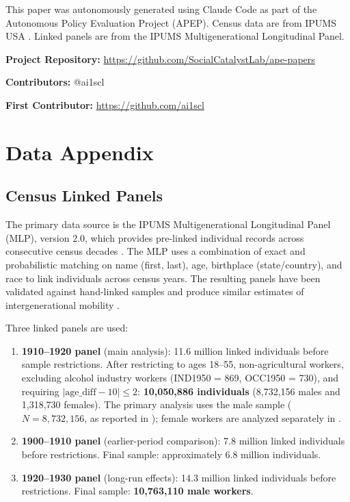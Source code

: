 \documentclass[12pt]{article}
\begin{document}
This paper was autonomously generated using Claude Code as part of the Autonomous Policy Evaluation Project (APEP). Census data are from IPUMS USA \citep{ruggles2021}. Linked panels are from the IPUMS Multigenerational Longitudinal Panel.

\noindent\textbf{Project Repository:} \url{https://github.com/SocialCatalystLab/ape-papers}

\noindent\textbf{Contributors:} @ai1scl

\noindent\textbf{First Contributor:} \url{https://github.com/ai1scl}

\label{apep_main_text_end}
\newpage


\newpage
\appendix

\section{Data Appendix}
\label{app:data}

\subsection{Census Linked Panels}

The primary data source is the IPUMS Multigenerational Longitudinal Panel (MLP), version 2.0, which provides pre-linked individual records across consecutive census decades \citep{ruggles2021, abramitzky2021}. The MLP uses a combination of exact and probabilistic matching on name (first, last), age, birthplace (state/country), and race to link individuals across census years. The resulting panels have been validated against hand-linked samples and produce similar estimates of intergenerational mobility \citep{feigenbaum2018, ward2023}.

Three linked panels are used:
\begin{enumerate}
    \item \textbf{1910--1920 panel} (main analysis): 11.6 million linked individuals before sample restrictions. After restricting to ages 18--55, non-agricultural workers, excluding alcohol industry workers (IND1950 = 869, OCC1950 = 730), and requiring $|\text{age\_diff} - 10| \leq 2$: \textbf{10,050,886 individuals} (8,732,156 males and 1,318,730 females). The primary analysis uses the male sample ($N = 8{,}732{,}156$, as reported in ); female workers are analyzed separately in .
    \item \textbf{1900--1910 panel} (earlier-period comparison): 7.8 million linked individuals before restrictions. Final sample: approximately 6.8 million individuals.
    \item \textbf{1920--1930 panel} (long-run effects): 14.3 million linked individuals before restrictions. Final sample: \textbf{10,763,110 male workers}.
\end{enumerate}
\end{document}
